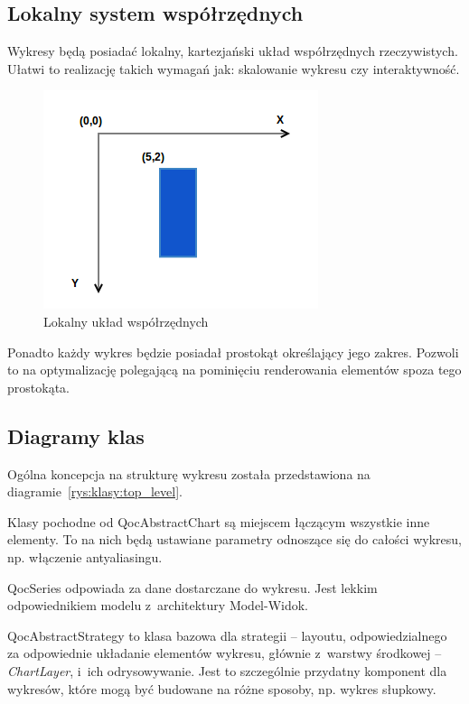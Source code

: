 \subsection{Lokalny system współrzędnych}
Wykresy będą posiadać lokalny, kartezjański układ współrzędnych rzeczywistych. Ułatwi to realizację takich wymagań jak: skalowanie wykresu czy interaktywność. 

\begin{figure}
\centering
\caption{Lokalny układ współrzędnych}\label{rys:uklad:wspolrzednych}
\includegraphics[scale=0.6]{img/uklad_wspolrzednych.png}
\end{figure}

Ponadto każdy wykres będzie posiadał prostokąt określający jego zakres. Pozwoli to na optymalizację polegającą na pominięciu renderowania elementów spoza tego prostokąta.

\subsection{Diagramy klas}
Ogólna koncepcja na strukturę wykresu została przedstawiona na diagramie~\ref{rys:klasy:top_level}.

Klasy pochodne od QocAbstractChart są miejscem łączącym wszystkie inne elementy. To na nich będą ustawiane parametry odnoszące się do całości wykresu, np. włączenie antyaliasingu.

QocSeries odpowiada za dane dostarczane do wykresu. Jest lekkim odpowiednikiem modelu z~architektury Model-Widok.

QocAbstractStrategy to klasa bazowa dla strategii -- layoutu, odpowiedzialnego za odpowiednie układanie elementów wykresu, głównie z~warstwy środkowej -- \textit{ChartLayer}, i~ich odrysowywanie. Jest to szczególnie przydatny komponent dla wykresów, które mogą być budowane na różne sposoby, np. wykres słupkowy.


